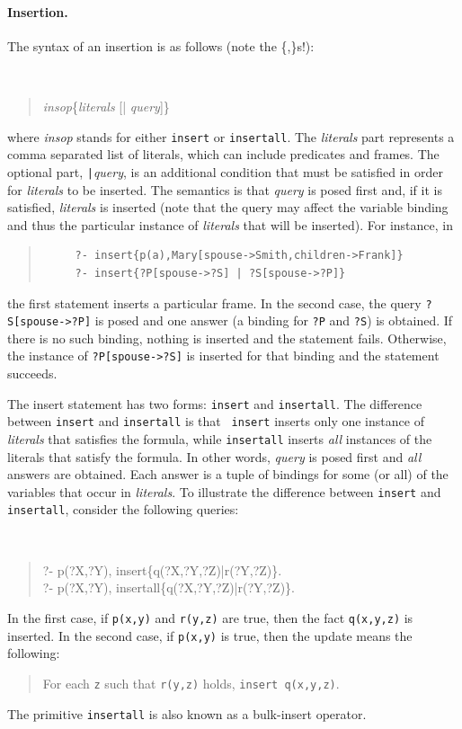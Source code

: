 \documentclass[11pt]{article}
\begin{document}
\paragraph{Insertion.} The syntax of an insertion is as follows (note the
\{,\}s!):
{\tt
\begin{quote}
\emph{insop}\{\emph{literals} [| \emph{query}]\}
\end{quote}
}
\noindent
where {\it insop} stands for either {\tt insert} or {\tt insertall}.
The
{\it literals} part represents a comma separated list of literals,
which can include
predicates and \mbox{frames}. The optional part, {\tt |}{\it query},
is an additional condition that must be satisfied in order for
\emph{literals} to be inserted.
The semantics is that \emph{query} is posed first and, if it is
satisfied, \emph{literals} is inserted (note that the query may affect the
variable binding and thus the particular instance of \emph{literals} that
will be inserted). For instance, in
\begin{quote}
\begin{verbatim}
     ?- insert{p(a),Mary[spouse->Smith,children->Frank]}
     ?- insert{?P[spouse->?S] | ?S[spouse->?P]}
\end{verbatim}
\end{quote}
the first statement inserts a particular frame. In the second case, the
query {\tt ?S[spouse->?P]} is posed and one answer (a binding for {\tt ?P} and
{\tt ?S}) is obtained. If there is no such binding, nothing is inserted and
the statement fails. Otherwise, the instance of {\tt ?P[spouse->?S]} is
inserted for that binding and the statement succeeds.

The insert statement has two forms: {\tt insert} and {\tt insertall}.
The difference between {\tt insert} and {\tt insertall} is that {\tt
  insert} inserts only one instance of \emph{literals} that satisfies the
formula, while {\tt insertall} inserts \emph{all} instances of the literals
that satisfy the formula. In other words, \emph{query} is posed first and
\emph{all} answers are obtained. Each answer is a tuple of bindings for
some (or all) of the variables that occur in \emph{literals}.  To
illustrate the difference between {\tt insert} and {\tt insertall},
consider the following queries:
{\tt
\begin{quote}
      ?- p(?X,?Y), insert\{q(?X,?Y,?Z)|r(?Y,?Z)\}.\\
      ?- p(?X,?Y), insertall\{q(?X,?Y,?Z)|r(?Y,?Z)\}.
\end{quote}
}
In the first case, if {\tt p(x,y)} and {\tt r(y,z)} are true, then the
fact {\tt q(x,y,z)} is inserted. In the second case, if {\tt p(x,y)} is
true, then the update means the following:
\begin{quote}
  For each {\tt z} such that {\tt r(y,z)} holds, {\tt insert q(x,y,z)}.
\end{quote}
The primitive {\tt insertall} is also known as a bulk-insert operator.
\end{document}
